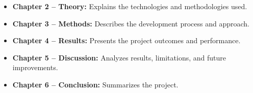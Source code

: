 \begin{itemize}
    
    \item \textbf{Chapter 2 -- Theory:} Explains the technologies and methodologies used.
    
    \item \textbf{Chapter 3 -- Methods:} Describes the development process and approach.
    
    \item \textbf{Chapter 4 -- Results:} Presents the project outcomes and performance.
    
    \item \textbf{Chapter 5 -- Discussion:} Analyzes results, limitations, and future improvements.
    
    \item \textbf{Chapter 6 -- Conclusion:} Summarizes the project.


    
\end{itemize}